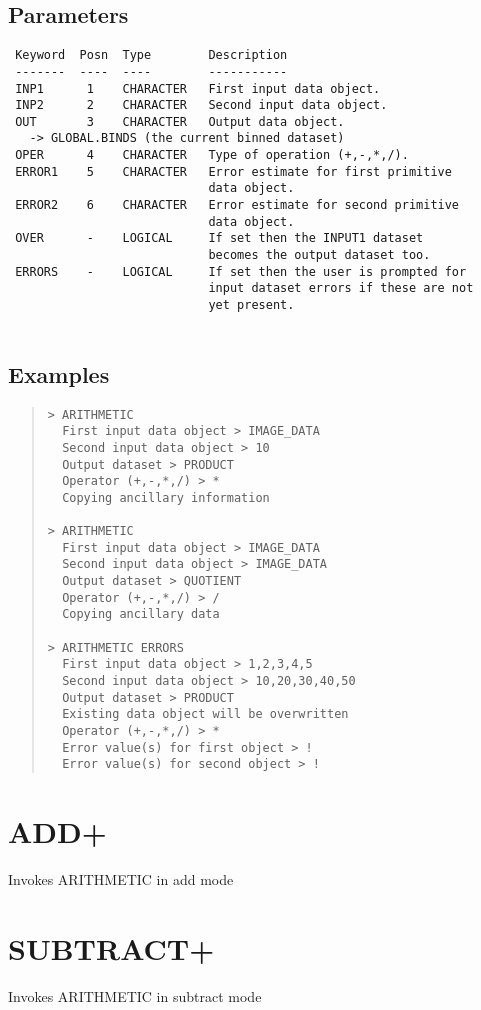 \documentclass{book}
\renewcommand{\_}{{\tt\char'137}}     %
\begin{document}
\subsection{Parameters}
\begin{verbatim}
 Keyword  Posn  Type        Description
 -------  ----  ----        -----------
 INP1      1    CHARACTER   First input data object.
 INP2      2    CHARACTER   Second input data object.
 OUT       3    CHARACTER   Output data object.
   -> GLOBAL.BINDS (the current binned dataset)
 OPER      4    CHARACTER   Type of operation (+,-,*,/).
 ERROR1    5    CHARACTER   Error estimate for first primitive
                            data object.
 ERROR2    6    CHARACTER   Error estimate for second primitive
                            data object.
 OVER      -    LOGICAL     If set then the INPUT1 dataset
                            becomes the output dataset too.
 ERRORS    -    LOGICAL     If set then the user is prompted for
                            input dataset errors if these are not
                            yet present.
 
\end{verbatim}\subsection{Examples}
\begin{quote}\begin{verbatim}
> ARITHMETIC
  First input data object > IMAGE_DATA
  Second input data object > 10
  Output dataset > PRODUCT
  Operator (+,-,*,/) > *
  Copying ancillary information
 
> ARITHMETIC
  First input data object > IMAGE_DATA
  Second input data object > IMAGE_DATA
  Output dataset > QUOTIENT
  Operator (+,-,*,/) > /
  Copying ancillary data
 
> ARITHMETIC ERRORS
  First input data object > 1,2,3,4,5
  Second input data object > 10,20,30,40,50
  Output dataset > PRODUCT
  Existing data object will be overwritten
  Operator (+,-,*,/) > *
  Error value(s) for first object > !
  Error value(s) for second object > !
\end{verbatim}\end{quote}
\section{ADD+}
Invokes ARITHMETIC in add mode
\section{SUBTRACT+}
Invokes ARITHMETIC in subtract mode
\end{document}

